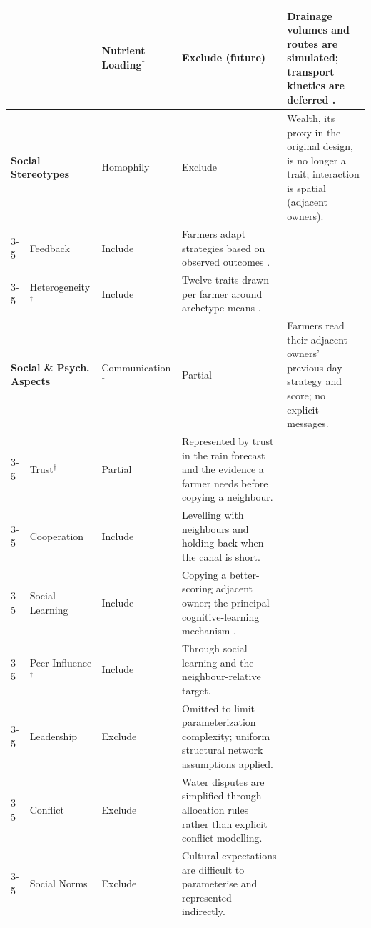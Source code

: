 \documentclass{article}
\begin{document}
\begin{changed}
\begin{tabular}{|p{0.5cm}|p{1.6cm}|p{2.2cm}|p{1.6cm}|p{10.8cm}|}
     & & Nutrient Loading$^\dagger$ & Exclude (future) & Drainage volumes and routes are simulated; transport kinetics are deferred \cite{Takeda2001Cyclic}. \\ \hline
     \multicolumn{2}{|p{2.1cm}|}{\textbf{Social Stereotypes}}
     & Homophily$^\dagger$ & Exclude & Wealth, its proxy in the original design, is no longer a trait; interaction is spatial (adjacent owners). \\ \cline{3-5}
     \multicolumn{2}{|l|}{} & Feedback & Include & Farmers adapt strategies based on observed outcomes \cite{Alam2022, Wens2021}. \\ \cline{3-5}
     \multicolumn{2}{|l|}{} & Heterogeneity$^\dagger$ & Include & Twelve traits drawn per farmer around archetype means \cite{Alam2022, Wens2021}. \\ \hline
     \multicolumn{2}{|p{2.1cm}|}{\textbf{Social \& Psych. Aspects}}
     & Communication$^\dagger$ & Partial & Farmers read their adjacent owners' previous-day strategy and score; no explicit messages. \\ \cline{3-5}
     \multicolumn{2}{|l|}{} & Trust$^\dagger$ & Partial & Represented by trust in the rain forecast and the evidence a farmer needs before copying a neighbour. \\ \cline{3-5}
     \multicolumn{2}{|l|}{} & Cooperation & Include & Levelling with neighbours and holding back when the canal is short. \\ \cline{3-5}
     \multicolumn{2}{|l|}{} & Social Learning & Include & Copying a better-scoring adjacent owner; the principal cognitive-learning mechanism \cite{Tao2021DigitalTwin}. \\ \cline{3-5}
     \multicolumn{2}{|l|}{} & Peer Influence$^\dagger$ & Include & Through social learning and the neighbour-relative target. \\ \cline{3-5}
     \multicolumn{2}{|l|}{} & Leadership & Exclude & Omitted to limit parameterization complexity; uniform structural network assumptions applied. \\ \cline{3-5}
     \multicolumn{2}{|l|}{} & Conflict & Exclude & Water disputes are simplified through allocation rules rather than explicit conflict modelling. \\ \cline{3-5}
     \multicolumn{2}{|l|}{} & Social Norms & Exclude & Cultural expectations are difficult to parameterise and represented indirectly. \\ \hline
\end{tabular}
\label{tab:scope}
\end{changed}
\end{document}
